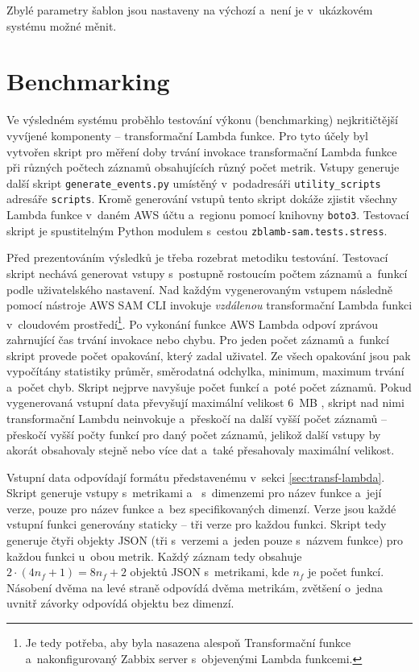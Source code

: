 \documentclass[czech, ing, kiv, he, iso690]{fasthesis}
\begin{document}
Zbylé parametry šablon jsou nastaveny na výchozí a~není je v~ukázkovém systému možné měnit.

\section{Benchmarking}

Ve výsledném systému proběhlo testování výkonu (benchmarking) nejkritičtější vyvíjené komponenty -- transformační Lambda funkce. Pro tyto účely byl vytvořen skript pro měření doby trvání invokace transformační Lambda funkce při různých počtech záznamů obsahujících různý počet metrik. Vstupy generuje další skript \verb|generate_events.py| umístěný v~podadresáři \verb|utility_scripts| adresáře \verb|scripts|. Kromě generování vstupů tento skript dokáže zjistit všechny Lambda funkce v~daném AWS účtu a~regionu pomocí knihovny \verb|boto3|. Testovací skript je spustitelným Python modulem s~cestou \verb|zblamb-sam.tests.stress|.

Před prezentováním výsledků je třeba rozebrat metodiku testování. Testovací skript nechává generovat vstupy s~postupně rostoucím počtem záznamů a~funkcí podle uživatelského nastavení. Nad každým vygenerovaným vstupem následně pomocí nástroje AWS SAM CLI invokuje \emph{vzdálenou} transformační Lambda funkci v~cloudovém prostředí\footnote{Je tedy potřeba, aby byla nasazena alespoň Transformační funkce a~nakonfigurovaný Zabbix server s~objevenými Lambda funkcemi.}. Po vykonání funkce AWS Lambda odpoví zprávou zahrnující čas trvání invokace nebo chybu. Pro jeden počet záznamů a~funkcí skript provede počet opakování, který zadal uživatel. Ze všech opakování jsou pak vypočítány statistiky průměr, směrodatná odchylka, minimum, maximum trvání a~počet chyb. Skript nejprve navyšuje počet funkcí a~poté počet záznamů. Pokud vygenerovaná vstupní data převyšují maximální velikost 6~MB \cite{lambda.docs.aws}, skript nad nimi transformační Lambdu neinvokuje a~přeskočí na další vyšší počet záznamů -- přeskočí vyšší počty funkcí pro daný počet záznamů, jelikož další vstupy by akorát obsahovaly stejně nebo více dat a~také přesahovaly maximální velikost.

Vstupní data odpovídají formátu představenému v~sekci \ref{sec:transf-lambda}. Skript generuje vstupy s~metrikami  a~ s~dimenzemi pro název funkce a~její verze, pouze pro název funkce a~bez specifikovaných dimenzí. Verze jsou každé vstupní funkci generovány staticky -- tři verze pro každou funkci. Skript tedy generuje čtyři objekty JSON (tři s~verzemi a~jeden pouze s~názvem funkce) pro každou funkci u~obou metrik. Každý záznam tedy obsahuje $2 \cdot (4n_f+1) = 8n_f+2$ objektů JSON s~metrikami, kde $n_f$ je počet funkcí. Násobení dvěma na levé straně odpovídá dvěma metrikám, zvětšení o~jedna uvnitř závorky odpovídá objektu bez dimenzí.
\end{document}
